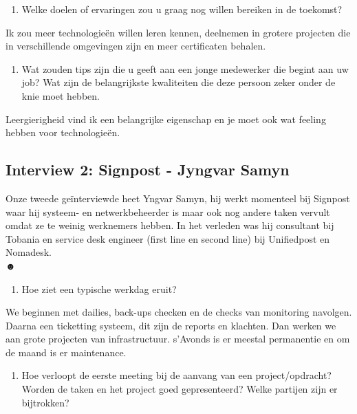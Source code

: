 \documentclass{hogent-article}
\begin{document}
    \begin{enumerate}[resume]\bfseries
        \item Welke doelen of ervaringen zou u graag nog willen bereiken in de toekomst?
    \end{enumerate}

    Ik zou meer technologieën willen leren kennen, deelnemen in grotere projecten die in verschillende omgevingen zijn en meer certificaten behalen.\\
    
    \begin{enumerate}[resume]\bfseries
        \item Wat zouden tips zijn die u geeft aan een jonge medewerker die begint aan uw job? Wat zijn de belangrijkste kwaliteiten die deze persoon zeker onder de knie moet hebben.
    \end{enumerate}

    Leergierigheid vind ik een belangrijke eigenschap en je moet ook wat feeling hebben voor technologieën.

    \subsection{Interview 2: Signpost - Jyngvar Samyn}
    Onze tweede geïnterviewde heet Yngvar Samyn, hij werkt momenteel bij Signpost waar hij systeem- en netwerkbeheerder is maar ook nog andere taken vervult omdat ze te weinig werknemers hebben. In het verleden was hij consultant bij Tobania en service desk engineer (first line en second line) bij Unifiedpost en Nomadesk.\\☻
    
    \begin{enumerate}\bfseries
        \item Hoe ziet een typische werkdag eruit?
    \end{enumerate}

    We beginnen met dailies, back-ups checken en de checks van monitoring navolgen. Daarna een ticketting systeem, dit zijn de reports en klachten. Dan werken we aan grote projecten van infrastructuur. s’Avonds is er meestal permanentie en om de maand is er maintenance.\\
    
    \begin{enumerate}[resume]\bfseries
        \item Hoe verloopt de eerste meeting bij de aanvang van een project/opdracht? Worden de taken en het project goed gepresenteerd? Welke partijen zijn er bijtrokken? 
    \end{enumerate} 
    
\end{document}
